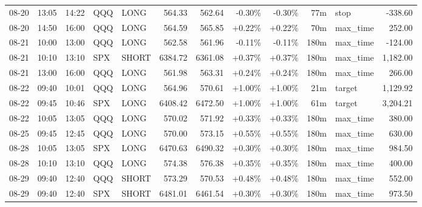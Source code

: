 \documentclass[11pt,a4paper,twoside]{article}
\begin{document}
\begin{center}
\begin{longtable}{>{\color{txtmain}}l l l l l r r r r r >{\color{txtmain}}l r}
08-20 & 13:05 & 14:22 & QQQ & LONG & 564.33 & 562.64 & \textcolor{lossred}{-0.30\%} & \textcolor{lossred}{-0.30\%} & 77m & stop & \textcolor{lossred}{-338.60} \\
08-20 & 14:50 & 16:00 & QQQ & LONG & 564.59 & 565.85 & \textcolor{wingreen}{+0.22\%} & \textcolor{wingreen}{+0.22\%} & 70m & max\_time & \textcolor{wingreen}{252.00} \\
08-21 & 10:00 & 13:00 & QQQ & LONG & 562.58 & 561.96 & \textcolor{lossred}{-0.11\%} & \textcolor{lossred}{-0.11\%} & 180m & max\_time & \textcolor{lossred}{-124.00} \\
08-21 & 10:10 & 13:10 & SPX & SHORT & 6384.72 & 6361.08 & \textcolor{wingreen}{+0.37\%} & \textcolor{wingreen}{+0.37\%} & 180m & max\_time & \textcolor{wingreen}{1,182.00} \\
08-21 & 13:00 & 16:00 & QQQ & LONG & 561.98 & 563.31 & \textcolor{wingreen}{+0.24\%} & \textcolor{wingreen}{+0.24\%} & 180m & max\_time & \textcolor{wingreen}{266.00} \\
08-22 & 09:40 & 10:01 & QQQ & LONG & 564.96 & 570.61 & \textcolor{wingreen}{+1.00\%} & \textcolor{wingreen}{+1.00\%} & 21m & target & \textcolor{wingreen}{1,129.92} \\
08-22 & 09:45 & 10:46 & SPX & LONG & 6408.42 & 6472.50 & \textcolor{wingreen}{+1.00\%} & \textcolor{wingreen}{+1.00\%} & 61m & target & \textcolor{wingreen}{3,204.21} \\
08-22 & 10:05 & 13:05 & QQQ & LONG & 570.02 & 571.92 & \textcolor{wingreen}{+0.33\%} & \textcolor{wingreen}{+0.33\%} & 180m & max\_time & \textcolor{wingreen}{380.00} \\
08-25 & 09:45 & 12:45 & QQQ & LONG & 570.00 & 573.15 & \textcolor{wingreen}{+0.55\%} & \textcolor{wingreen}{+0.55\%} & 180m & max\_time & \textcolor{wingreen}{630.00} \\
08-28 & 10:05 & 13:05 & SPX & LONG & 6470.63 & 6490.32 & \textcolor{wingreen}{+0.30\%} & \textcolor{wingreen}{+0.30\%} & 180m & max\_time & \textcolor{wingreen}{984.50} \\
08-28 & 10:10 & 13:10 & QQQ & LONG & 574.38 & 576.38 & \textcolor{wingreen}{+0.35\%} & \textcolor{wingreen}{+0.35\%} & 180m & max\_time & \textcolor{wingreen}{400.00} \\
08-29 & 09:40 & 12:40 & QQQ & SHORT & 573.29 & 570.53 & \textcolor{wingreen}{+0.48\%} & \textcolor{wingreen}{+0.48\%} & 180m & max\_time & \textcolor{wingreen}{552.00} \\
08-29 & 09:40 & 12:40 & SPX & SHORT & 6481.01 & 6461.54 & \textcolor{wingreen}{+0.30\%} & \textcolor{wingreen}{+0.30\%} & 180m & max\_time & \textcolor{wingreen}{973.50} \\

\end{longtable}
\end{center}
\end{document}
